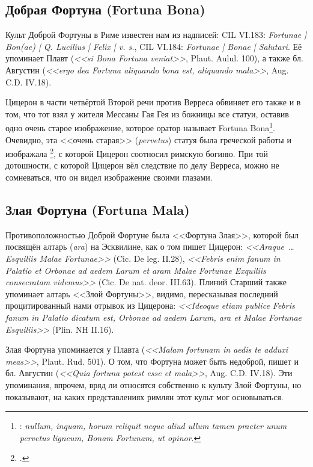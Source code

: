 \subsection{Добрая Фортуна (Fortuna Bona)}\label{FortunaBona}

Культ Доброй Фортуны в Риме известен нам из надписей: CIL VI.183: \textit{Fortunae | Bon(ae) | Q. Lucilius | Felix | v. s.}, CIL VI.184: \textit{Fortunae | Bonae | Salutari}. Её упоминает Плавт (\textit{<<si Bona Fortuna veniat>>}, Plaut. Aulul. 100), а также бл. Августин (\textit{<<ergo dea Fortuna aliquando bona est, aliquando mala>>}, Aug. C.D. IV.18).

Цицерон в части четвёртой Второй речи против Верреса обвиняет его также и в том, что тот взял у жителя Мессаны Гая Гея из божницы все статуи, оставив одно очень старое изображение, которое оратор называет Fortuna Bona\footnote{: \textit{nullum, inquam, horum reliquit neque aliud ullum tamen praeter unum pervetus ligneum, Bonam Fortunam, ut opinor}.}. Очевидно, эта <<очень старая>> (\textit{pervetus}) статуя была греческой работы и изображала \footcite[Sp. 1512]{Peter1890Fortuna}, с которой Цицерон соотносил римскую богиню. При той дотошности, с которой Цицерон вёл следствие по делу Верреса, можно не сомневаться, что он видел изображение своими глазами.

\subsection{Злая Фортуна (Fortuna Mala)}\label{FortunaMala}

Противоположностью Доброй Фортуне была <<Фортуна Злая>>, которой был посвящён алтарь (\textit{ara}) на Эсквилине, как о том пишет Цицерон: \textit{<<Araque~\ldots Esquiliis Malae Fortunae>>} (Cic. De leg. II.28), \textit{<<Febris enim fanum in Palatio et Orbonae ad aedem Larum et aram Malae Fortunae Exquiliis consecratam videmus>>} (Cic. De nat. deor. III.63). Плиний Старший также упоминает алтарь <<Злой Фортуны>>, видимо, пересказывая последний процитированный нами отрывок из Цицерона: \textit{<<Ideoque etiam publice Febris fanum in Palatio dicatum est, Orbonae ad aedem Larum, ara et Malae Fortunae Esquiliis>>} (Plin. NH II.16).

Злая Фортуна упоминается у Плавта (\textit{<<Malam fortunam in aedis te adduxi meas>>}, Plaut. Rud. 501). О том, что Фортуна может быть недоброй, пишет и бл. Августин (\textit{<<Quia fortuna potest esse et mala>>}, Aug. C.D. IV.18). Эти упоминания, впрочем, вряд ли относятся собственно к культу Злой Фортуны, но показывают, на каких представлениях римлян этот культ мог основываться.

